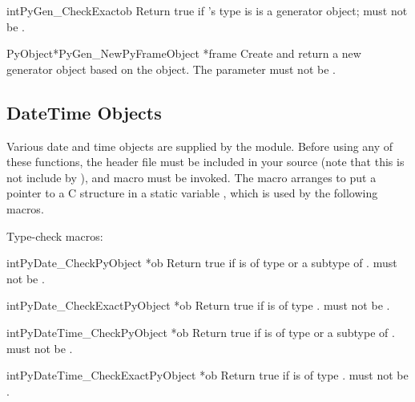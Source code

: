 \begin{cfuncdesc}{int}{PyGen_CheckExact}{ob}
  Return true if 's type is 
  is a generator object;  must not be
  \NULL{}.
\end{cfuncdesc}

\begin{cfuncdesc}{PyObject*}{PyGen_New}{PyFrameObject *frame}
  Create and return a new generator object based on the  object.
  The parameter must not be \NULL{}.
\end{cfuncdesc}


\subsection{DateTime Objects \label{datetime-objects}}

Various date and time objects are supplied by the 
module.  Before using any of these functions, the header file
 must be included in your source (note that this is
not include by ), and macro 
must be invoked.  The macro arranges to put a pointer to a C structure
in a static variable , which is used by the following
macros.

Type-check macros:

\begin{cfuncdesc}{int}{PyDate_Check}{PyObject *ob}
  Return true if  is of type  or
  a subtype of .   must not be
  \NULL{}.
\end{cfuncdesc}

\begin{cfuncdesc}{int}{PyDate_CheckExact}{PyObject *ob}
  Return true if  is of type .
   must not be \NULL{}.
\end{cfuncdesc}

\begin{cfuncdesc}{int}{PyDateTime_Check}{PyObject *ob}
  Return true if  is of type  or
  a subtype of .   must not be
  \NULL{}.
\end{cfuncdesc}

\begin{cfuncdesc}{int}{PyDateTime_CheckExact}{PyObject *ob}
  Return true if  is of type .
   must not be \NULL{}.
\end{cfuncdesc}

